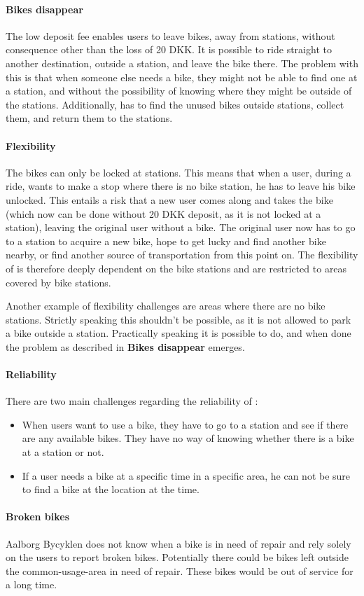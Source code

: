 \paragraph{Bikes disappear}
The low deposit fee enables users to leave bikes, away from stations, without consequence other than the loss of 20 DKK.
It is possible to ride straight to another destination, outside a station, and leave the bike there.
The problem with this is that when someone else needs a bike, they might not be able to find one at a station, and without the possibility of knowing where they might be outside of the stations.
Additionally, \citybike has to find the unused bikes outside stations, collect them, and return them to the stations.

\paragraph{Flexibility}
The bikes can only be locked at stations.
This means that when a user, during a ride, wants to make a stop where there is no bike station, he has to leave his bike unlocked.
This entails a risk that a new user comes along and takes the bike (which now can be done without 20 DKK deposit, as it is not locked at a station), leaving the original user without a bike.
The original user now has to go to a station to acquire a new bike, hope to get lucky and find another bike nearby, or find another source of transportation from this point on.
The flexibility of \citybike is therefore deeply dependent on the bike stations and are restricted to areas covered by bike stations.

Another example of flexibility challenges are areas where there are no bike stations.
Strictly speaking this shouldn't be possible, as it is not allowed to park a bike outside a station.
Practically speaking it is possible to do, and when done the problem as described in \textbf{Bikes disappear} emerges.

\paragraph{Reliability}
There are two main challenges regarding the reliability of \citybike:
\begin{itemize}
\item When users want to use a bike, they have to go to a station and see if there are any available bikes.
They have no way of knowing whether there is a bike at a station or not.
\item If a user needs a bike at a specific time in a specific area, he can not be sure to find a bike at the location at the time.
\end{itemize}

\paragraph{Broken bikes}
Aalborg Bycyklen does not know when a bike is in need of repair and rely solely on the users to report broken bikes.
Potentially there could be bikes left outside the common-usage-area in need of repair. These bikes would be out of service for a long time.

